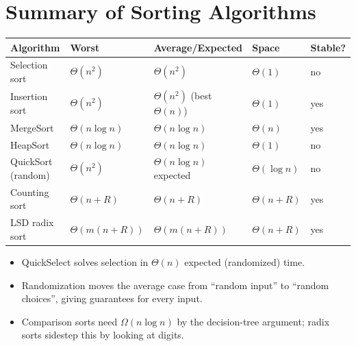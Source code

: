 \section{Summary of Sorting Algorithms}

\begin{center}
\begin{tabular}{lllll}
\toprule
Algorithm & Worst & Average/Expected & Space & Stable?\\
\midrule
Selection sort & $\Theta(n^2)$ & $\Theta(n^2)$ & $\Theta(1)$ & no\\
Insertion sort & $\Theta(n^2)$ & $\Theta(n^2)$ (best $\Theta(n)$) & $\Theta(1)$ & yes\\
MergeSort & $\Theta(n\log n)$ & $\Theta(n\log n)$ & $\Theta(n)$ & yes\\
HeapSort & $\Theta(n\log n)$ & $\Theta(n\log n)$ & $\Theta(1)$ & no\\
QuickSort (random) & $\Theta(n^2)$ & $\Theta(n\log n)$ expected & $\Theta(\log n)$ & no\\
Counting sort & $\Theta(n+R)$ & $\Theta(n+R)$ & $\Theta(n+R)$ & yes\\
LSD radix sort & $\Theta(m(n+R))$ & $\Theta(m(n+R))$ & $\Theta(n+R)$ & yes\\
\bottomrule
\end{tabular}
\end{center}

\begin{itemize}
  \item QuickSelect solves selection in $\Theta(n)$ expected (randomized) time.
  \item Randomization moves the average case from ``random input'' to ``random
        choices'', giving guarantees for every input.
  \item Comparison sorts need $\Omega(n \log n)$ by the decision-tree argument;
        radix sorts sidestep this by looking at digits.
\end{itemize}
